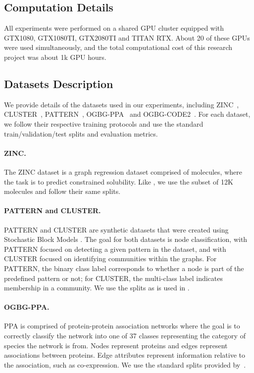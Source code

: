\subsection{Computation Details}
All experiments were performed on a shared GPU cluster equipped with GTX1080, GTX1080TI, GTX2080TI and TITAN RTX. About 20 of these GPUs were used simultaneously, and the total computational cost of this research project was about 1k GPU hours.

\subsection{Datasets Description}
We provide details of the datasets used in our experiments, including ZINC~\citep{ZINC}, CLUSTER~\citep{dwivedi2020benchmarkgnns}, PATTERN~\citep{dwivedi2020benchmarkgnns}, OGBG-PPA~\citep{hu2020open} and OGBG-CODE2~\citep{hu2020open}. For each dataset, we follow their respective training protocols and use the standard train/validation/test splits and evaluation metrics.

\paragraph{ZINC.} The ZINC dataset is a graph regression dataset comprised of molecules, where the task is to predict constrained solubility. Like \citet{dwivedi2020benchmarkgnns}, we use the subset of 12K molecules and follow their same splits.

\paragraph{PATTERN and CLUSTER.} PATTERN and CLUSTER \citet{dwivedi2020benchmarkgnns} are synthetic datasets that were created using Stochastic Block Models \citep{PatternCluster2018}. The goal for both datasets is node classification, with PATTERN focused on detecting a given pattern in the dataset, and with CLUSTER focused on identifying communities within the graphs. For PATTERN, the binary class label corresponds to whether a node is part of the predefined pattern or not; for CLUSTER, the multi-class label indicates membership in a community. We use the splits as is used in \citet{dwivedi2020benchmarkgnns}.

\paragraph{OGBG-PPA.} PPA \citep{hu2020open} is comprised of protein-protein association networks where the goal is to correctly classify the network into one of 37 classes representing the category of species the network is from. Nodes represent proteins and edges represent associations between proteins. Edge attributes represent information relative to the association, such as co-expression. We use the standard splits provided by~\citet{hu2020open}.

